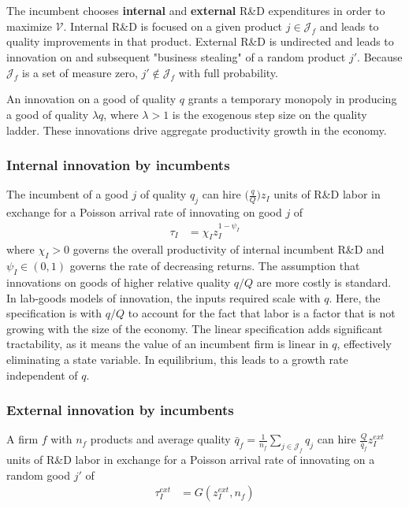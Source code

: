 \documentclass[11pt,english]{article}
\theoremstyle{remark}
\begin{document}
The incumbent chooses \textbf{internal} and \textbf{external} R\&D expenditures in order to maximize $\mathcal{V}$. Internal R\&D is focused on a given product $j \in \mathcal{J}_f$ and leads to quality improvements in that product. External R\&D is undirected and leads to innovation on and subsequent "business stealing" of a random product $j'$. Because $\mathcal{J}_f$ is a set of measure zero, $j' \notin \mathcal{J}_f$ with full probability. 

An innovation on a good of quality $q$ grants a temporary monopoly in producing a good of quality $\lambda q$, where $\lambda > 1$ is the exogenous step size on the quality ladder. These innovations drive aggregate productivity growth in the economy.

\subsubsection{Internal innovation by incumbents}

The incumbent of a good $j$ of quality $q_j$ can hire $\big(\frac{q}{Q}\big)z_I$ units of R\&D labor in exchange for a Poisson arrival rate of innovating on good $j$ of
\begin{align}
\tau_I &= \chi_I z_I^{1-\psi_I}  \label{incumbent_innovation_rate}
\end{align}
where $\chi_I > 0$ governs the overall productivity of internal incumbent R\&D and $\psi_I \in (0,1)$ governs the rate of decreasing returns. The assumption that innovations on goods of higher relative quality $q/Q$ are more costly is standard. In lab-goods models of innovation, the inputs required scale with $q$. Here, the specification is with $q/Q$ to account for the fact that labor is a factor that is not growing with the size of the economy. The linear specification adds significant tractability, as it means the value of an incumbent firm is linear in $q$, effectively eliminating a state variable. In equilibrium, this leads to a growth rate independent of $q$. 

\subsubsection{External innovation by incumbents}

A firm $f$ with $n_f$ products and average quality $\bar{q}_f = \frac{1}{n_f}\sum_{j \in \mathcal{J}_f} q_{j}$ can hire $\frac{Q}{\bar{q}_f} z_I^{ext}$ units of R\&D labor in exchange for a Poisson arrival rate of innovating on a random good $j'$ of 
\begin{align}
	\tau_I^{ext} &= G(z_I^{ext},n_f)
\end{align}
\end{document}
